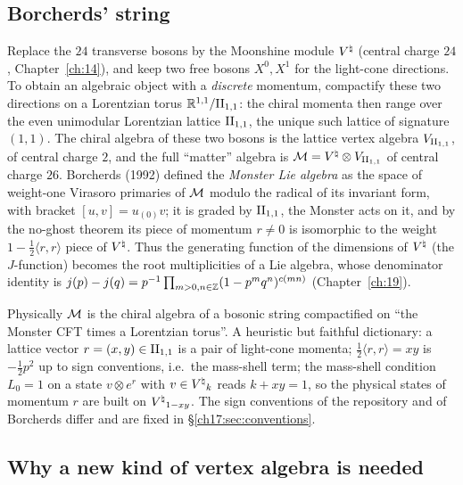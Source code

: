 \subsection{Borcherds' string}

Replace the $24$ transverse bosons by the Moonshine module ${V^{\natural}}$ (central charge $24$,
Chapter~\ref{ch:14}), and keep two free bosons $X^0,X^1$ for the light-cone directions.  To obtain an
algebraic object with a \emph{discrete} momentum, compactify these two directions on a Lorentzian torus
$\mathbb R^{1,1}/{\mathrm{II}_{1,1}}$: the chiral momenta then range over the even unimodular Lorentzian lattice
${\mathrm{II}_{1,1}}$, the unique such lattice of signature $(1,1)$.  The chiral algebra of these two bosons is
the lattice vertex algebra ${V_{\mathrm{II}_{1,1}}}$, of central charge $2$, and the full ``matter'' algebra is
$\mathcal{M}={V^{\natural}}\otimes{V_{\mathrm{II}_{1,1}}}$ of central charge $26$.  Borcherds (1992) defined the
\emph{Monster Lie algebra} as the space of weight-one Virasoro primaries of $\mathcal{M}$ modulo the
radical of its invariant form, with bracket $[u,v]=u_{(0)}v$; it is graded by ${\mathrm{II}_{1,1}}$, the
Monster acts on it, and by the no-ghost theorem its piece of momentum $r\ne0$ is isomorphic to the weight
$1-\tfrac12\langle r,r\rangle$ piece of ${V^{\natural}}$.  Thus the generating function of the dimensions of
${V^{\natural}}$ (the $J$-function) becomes the root multiplicities of a Lie algebra, whose denominator identity
is $j(p)-j(q)=p^{-1}\prod_{m>0,n\in{\mathbb{Z}}}(1-p^mq^n)^{c(mn)}$ (Chapter~\ref{ch:19}).

\begin{physics}
Physically $\mathcal{M}$ is the chiral algebra of a bosonic string compactified on ``the Monster CFT
times a Lorentzian torus''.  A heuristic but faithful dictionary: a lattice vector $r=(x,y)\in{\mathrm{II}_{1,1}}$
is a pair of light-cone momenta; $\tfrac12\langle r,r\rangle=xy$ is $-\tfrac12p^2$ up to sign conventions, i.e.\
the mass-shell term; the mass-shell condition $L_0=1$ on a state $v\otimes e^r$ with $v\in{V^{\natural}}_k$ reads
$k+xy=1$, so the physical states of momentum $r$ are built on ${V^{\natural}}_{1-xy}$.  The sign conventions of the
repository and of Borcherds differ and are fixed in \S\ref{ch17:sec:conventions}.
\end{physics}

\subsection{Why a new kind of vertex algebra is needed}\label{ch17:sec:whynew}


